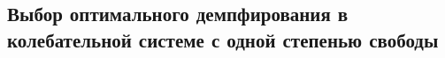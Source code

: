 

\subsection{Выбор оптимального демпфирования в колебательной системе с одной степенью свободы}



